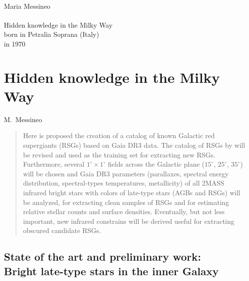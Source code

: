 \documentclass[final,11pt,onecolumn,a4paper,twoside]{scrbook_gj}
\begin{document}


{\clearpage\thispagestyle{empty}}
\begin{center}
\ \\ {\LARGE Maria Messineo} \ \\
\ \\ {\LARGE Hidden knowledge in the Milky Way} \ \\
\vspace{1.5 cm}
born in Petralia Soprana (Italy)\\
in 1970 \\
\end{center}
\tableofcontents
\mainmatter


   \chapter*{Hidden knowledge in the Milky Way }
\chaptermark{}
 
\begin{authorline}
        M.\ Messineo
\end{authorline}
 
\begin{abstract} 
Here is proposed the  creation of a catalog 
of known Galactic red supergiants (RSGs)
based on Gaia DR3 data.  
The catalog of RSGs by \citet{messineo19}
will be revised and used as the training set 
for extracting new RSGs.
Furthermore, several $1^\circ \times 1^\circ$ 
fields across the Galactic plane 
($15^\circ$, $25^\circ$, $35^\circ$) will be chosen
and Gaia DR3 parameters 
(parallaxes, spectral energy distribution, spectral-types
temperatures, metallicity) of all 2MASS infrared bright stars
with colors of  late-type stars (AGBs and RSGs) 
will be analyzed, 
for extracting  clean samples of RSGs and for estimating
relative stellar counts and surface densities.
Eventually, but not less important, new infrared constrains
will be derived useful  for extracting   obscured
candidate RSGs.
\end{abstract}

\section{State of the art and preliminary work:\\
Bright late-type stars in the inner Galaxy}
\end{document}
